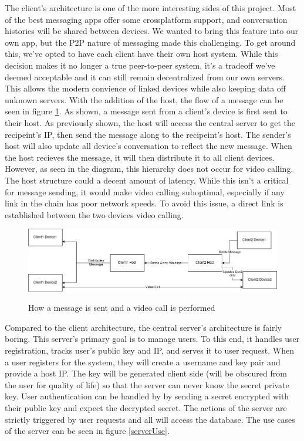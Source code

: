 \documentclass[titlepage]{article}
\begin{document}
    The client's architecture is one of the more interesting sides of this project.
    Most of the best messaging apps offer some crossplatform support, and conversation histories will be shared between devices.
    We wanted to bring this feature into our own app, but the P2P nature of messaging made this challenging.
    To get around this, we've opted to have each client have their own host system.
    While this decision makes it no longer a true peer-to-peer system, it's a tradeoff we've deemed acceptable and it can still remain decentralized from our own servers.
    This allows the modern convience of linked devices while also keeping data off unknown servers.
    With the addition of the host, the flow of a message can be seen in figure \ref{clientHost}.
    As shown, a message sent from a client's device is first sent to their host.
    As previously shown, the host will access the central server to get the recipeint's IP, then send the message along to the recipeint's host.
    The sender's host will also update all device's conversation to reflect the new message.
    When the host recieves the message, it will then distribute it to all client devices.
    However, as seen in the diagram, this hierarchy does not occur for video calling.
    The host structure could a decent amount of latency.
    While this isn't a critical for message sending, it would make video calling suboptimal, especially if any link in the chain has poor network speeds.
    To avoid this issue, a direct link is established between the two devices video calling.

    \begin{center}
        \begin{figure}[!ht]
            \includegraphics[scale=.5]{graphics/clientHost.png}
            \label{clientHost}
            \caption{How a message is sent and a video call is performed}
        \end{figure}
    \end{center}

    Compared to the client architecture, the central server's architecture is fairly boring.
    This server's primary goal is to manage users.
    To this end, it handles user registration, tracks user's public key and IP, and serves it to user request.
    When a user registers for the system, they will create a username and key pair and provide a host IP. 
    The key will be generated client side (will be obscured from the user for quality of life) so that the server can never know the secret private key.
    User authentication can be handled by by sending a secret encrypted with their public key and expect the decrypted secret.
    The actions of the server are strictly triggered by user requests and all will access the database.
    The use cases of the server can be seen in figure \ref{serverUse}.
\end{document}
